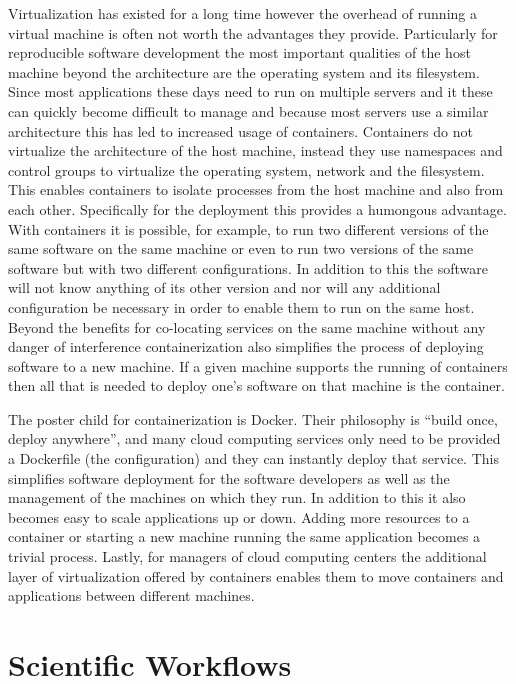 Virtualization has existed for a long time however the overhead of running a virtual machine is often not worth the advantages they provide. Particularly for reproducible software development the most important qualities of the host machine beyond the architecture are the operating system and its filesystem. Since most applications these days need to run on multiple servers and it these can quickly become difficult to manage and because most servers use a similar architecture this has led to increased usage of containers. Containers do not virtualize the architecture of the host machine, instead they use namespaces and control groups to virtualize the operating system, network and the filesystem. This enables containers to isolate processes from the host machine and also from each other. Specifically for the deployment this provides a humongous advantage. With containers it is possible, for example, to run two different versions of the same software on the same machine or even to run two versions of the same software but with two different configurations. In addition to this the software will not know anything of its other version and nor will any additional configuration be necessary in order to enable them to run on the same host. Beyond the benefits for co-locating services on the same machine without any danger of interference containerization also simplifies the process of deploying software to a new machine. If a given machine supports the running of containers then all that is needed to deploy one's software on that machine is the container. 

The poster child for containerization is Docker. Their philosophy is ``build once, deploy anywhere'', and many cloud computing services only need to be provided a Dockerfile (the configuration) and they can instantly deploy that service. This simplifies software deployment for the software developers as well as the management of the machines on which they run. In addition to this it also becomes easy to scale applications up or down. Adding more resources to a container or starting a new machine running the same application becomes a trivial process. Lastly, for managers of cloud computing centers the additional layer of virtualization offered by containers enables them to move containers and applications between different machines. 

\section{Scientific Workflows}
\label{sec:workflows}

